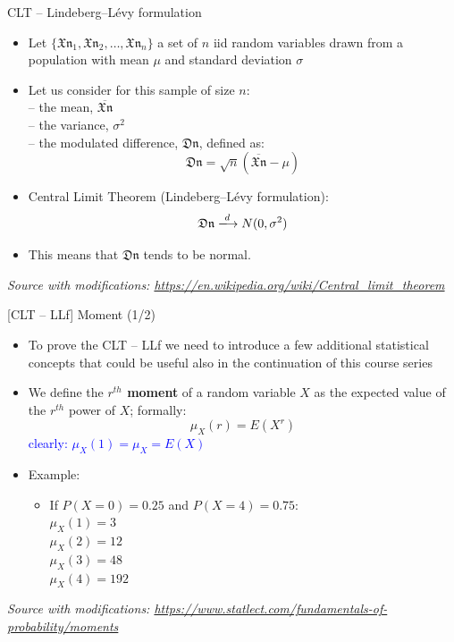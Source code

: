 \documentclass{beamer}
\begin{document}
\begin{frame}
{\centerline{CLT -- Lindeberg–L\'{e}vy formulation}}


\begin{itemize}
\item Let $\{ \mathfrak{Xn}_1, \mathfrak{Xn}_2, \ldots{}, \mathfrak{Xn}_n\}$ a set of $n$ iid random variables drawn from a population with mean $\mu$ and standard deviation $\sigma$
\item Let us consider for this sample of size $n$:\\
-- the mean, $\overline{\mathfrak{Xn}}$\\
-- the variance, $\sigma^2$\\
-- the modulated difference, $\mathfrak{Dn}$, defined as:
$$\mathfrak{Dn} = \sqrt{n}(\overline{\mathfrak{Xn}}-\mu)$$

\item Central Limit Theorem (Lindeberg–L\'{e}vy formulation):
$$\mathfrak{Dn} \xlongrightarrow{d} N(0,\sigma^2)$$

\item This means that $\mathfrak{Dn}$ tends to be normal.

\end{itemize}

\textit{\small
Source with modifications: \url{https://en.wikipedia.org/wiki/Central_limit_theorem}}
\end{frame}

\begin{frame}
{\centerline{[CLT -- LLf] Moment (1/2)}}


\begin{itemize}
\item To prove the CLT -- LLf we need to introduce a few additional statistical concepts that could be useful also in the continuation of this course series
\item We define the \textbf{$r^{th}$ moment} of a random variable $X$ as the expected value of the $r^{th}$ power of $X$; formally:
$$ \mu_X(r) = E(X^r)$$
\textcolor{blue}{clearly: $ \mu_X(1) = \mu_X = E(X)$}
\item Example:
\begin{itemize}
\item If $P(X=0) = 0.25$ and $P(X=4) = 0.75$:\\
$\mu_X(1) = 3$\\
$\mu_X(2) = 12$\\
$\mu_X(3) = 48$\\
$\mu_X(4) = 192$\\
\end{itemize}

\end{itemize}

\textit{\small
Source with modifications: \url{https://www.statlect.com/fundamentals-of-probability/moments}}
\end{frame}
\end{document}
